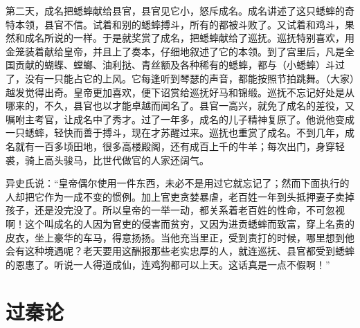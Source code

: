 \documentclass[12pt,UTF-8,openany]{ctexbook}
\begin{document}
\begin{normalsize}
    第二天，成名把蟋蟀献给县官，县官见它小，怒斥成名。成名讲述了这只蟋蟀的奇特本领，县官不信。试着和别的蟋蟀搏斗，所有的都被斗败了。又试着和鸡斗，果然和成名所说的一样。于是就奖赏了成名，把蟋蟀献给了巡抚。巡抚特别喜欢，用金笼装着献给皇帝，并且上了奏本，仔细地叙述了它的本领。到了宫里后，凡是全国贡献的蝴蝶、螳螂、油利挞、青丝额及各种稀有的蟋蟀，都与（小蟋蟀）斗过了，没有一只能占它的上风。它每逢听到琴瑟的声音，都能按照节拍跳舞。（大家）越发觉得出奇。皇帝更加喜欢，便下诏赏给巡抚好马和锦缎。巡抚不忘记好处是从哪来的，不久，县官也以才能卓越而闻名了。县官一高兴，就免了成名的差役，又嘱咐主考官，让成名中了秀才。过了一年多，成名的儿子精神复原了。他说他变成一只蟋蟀，轻快而善于搏斗，现在才苏醒过来。巡抚也重赏了成名。不到几年，成名就有一百多顷田地，很多高楼殿阁，还有成百上千的牛羊；每次出门，身穿轻裘，骑上高头骏马，比世代做官的人家还阔气。
    
    异史氏说：“皇帝偶尔使用一件东西，未必不是用过它就忘记了；然而下面执行的人却把它作为一成不变的惯例。加上官吏贪婪暴虐，老百姓一年到头抵押妻子卖掉孩子，还是没完没了。所以皇帝的一举一动，都关系着老百姓的性命，不可忽视啊！这个叫成名的人因为官吏的侵害而贫穷，又因为进贡蟋蟀而致富，穿上名贵的皮衣，坐上豪华的车马，得意扬扬。当他充当里正，受到责打的时候，哪里想到他会有这种境遇呢？老天要用这酬报那些老实忠厚的人，就连巡抚、县官都受到蟋蟀的恩惠了。听说一人得道成仙，连鸡狗都可以上天。这话真是一点不假啊！”
    
\end{normalsize}



\chapter{过秦论}
\end{document}
